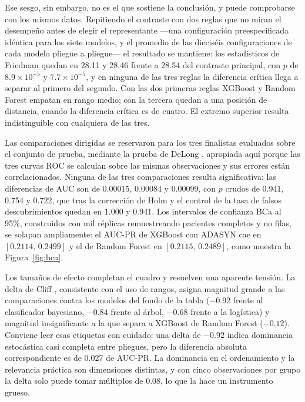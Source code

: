 \documentclass[pdflatex,sn-mathphys-num]{sn-jnl}
\begin{document}
Ese sesgo, sin embargo, no es el que sostiene la conclusión, y puede comprobarse con los mismos datos. Repitiendo el contraste con dos reglas que no miran el desempeño antes de elegir el representante —una configuración preespecificada idéntica para los siete modelos, y el promedio de las dieciséis configuraciones de cada modelo pliegue a pliegue— el resultado se mantiene: los estadísticos de Friedman quedan en 28.11 y 28.46 frente a 28.54 del contraste principal, con $p$ de $8.9\times10^{-5}$ y $7.7\times10^{-5}$, y en ninguna de las tres reglas la diferencia crítica llega a separar al primero del segundo. Con las dos primeras reglas XGBoost y Random Forest empatan en rango medio; con la tercera quedan a una posición de distancia, cuando la diferencia crítica es de cuatro. El extremo superior resulta indistinguible con cualquiera de las tres.

Las comparaciones dirigidas se reservaron para los tres finalistas evaluados sobre el conjunto de prueba, mediante la prueba de DeLong \cite{bib_delong}, apropiada aquí porque las tres curvas ROC se calculan sobre las mismas observaciones y sus errores están correlacionados. Ninguna de las tres comparaciones resulta significativa: las diferencias de AUC son de 0.00015, 0.00084 y 0.00099, con $p$ crudos de 0.941, 0.754 y 0.722, que tras la corrección de Holm \cite{bib_holm} y el control de la tasa de falsos descubrimientos \cite{bib_bh} quedan en 1.000 y 0.941. Los intervalos de confianza BCa \cite{bib_efron} al 95\%, construidos con mil réplicas remuestreando pacientes completos y no filas, se solapan ampliamente: el AUC-PR de XGBoost con ADASYN cae en $[0.2114,\, 0.2499]$ y el de Random Forest en $[0.2115,\, 0.2489]$, como muestra la Figura~\ref{fig:bca}.

Los tamaños de efecto completan el cuadro y resuelven una aparente tensión. La delta de Cliff \cite{bib_cliff}, consistente con el uso de rangos, asigna magnitud grande a las comparaciones contra los modelos del fondo de la tabla ($-0.92$ frente al clasificador bayesiano, $-0.84$ frente al árbol, $-0.68$ frente a la logística) y magnitud insignificante a la que separa a XGBoost de Random Forest ($-0.12$). Conviene leer esas etiquetas con cuidado: una delta de $-0.92$ indica dominancia estocástica casi completa entre pliegues, pero la diferencia absoluta correspondiente es de 0.027 de AUC-PR. La dominancia en el ordenamiento y la relevancia práctica son dimensiones distintas, y con cinco observaciones por grupo la delta solo puede tomar múltiplos de 0.08, lo que la hace un instrumento grueso.
\end{document}
